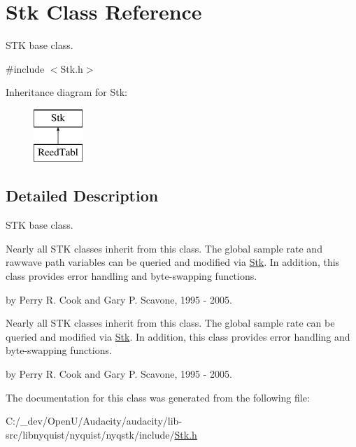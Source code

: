 \hypertarget{class_stk}{}\section{Stk Class Reference}
\label{class_stk}


S\+TK base class.  




{\ttfamily \#include $<$Stk.\+h$>$}

Inheritance diagram for Stk\+:\begin{figure}[H]
\begin{center}
\leavevmode
\includegraphics[height=2.000000cm]{class_stk}
\end{center}
\end{figure}


\subsection{Detailed Description}
S\+TK base class. 

Nearly all S\+TK classes inherit from this class. The global sample rate and rawwave path variables can be queried and modified via \hyperlink{class_stk}{Stk}. In addition, this class provides error handling and byte-\/swapping functions.

by Perry R. Cook and Gary P. Scavone, 1995 -\/ 2005.

Nearly all S\+TK classes inherit from this class. The global sample rate can be queried and modified via \hyperlink{class_stk}{Stk}. In addition, this class provides error handling and byte-\/swapping functions.

by Perry R. Cook and Gary P. Scavone, 1995 -\/ 2005. 

The documentation for this class was generated from the following file\+:\begin{DoxyCompactItemize}
\item 
C\+:/\+\_\+dev/\+Open\+U/\+Audacity/audacity/lib-\/src/libnyquist/nyquist/nyqstk/include/\hyperlink{_stk_8h}{Stk.\+h}\end{DoxyCompactItemize}
